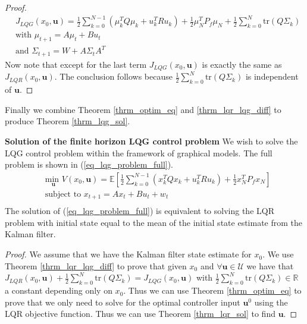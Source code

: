 \begin{proof}
\begin{equation}
\begin{aligned}
&J_{LQG}(x_0, \mathbf{u}) = \frac{1}{2}\sum_{k=0}^{N-1} \left( \mu_k^TQ\mu_k + u_k^TRu_k \right) + \frac{1}{2}\mu_N^TP_f\mu_N + \frac{1}{2}\sum_{k=0}^N \text{tr}(Q\Sigma_k) \\
&\text{with } \mu_{t+1} = A\mu_t +Bu_t \\
&\text{and } \Sigma_{t+1} = W+A\Sigma_t A^T 
\end{aligned}
\label{eq_simpl_obj_func}
\end{equation}
Now note that except for the last term $J_{LQG}(x_0, \mathbf{u})$ is exactly the same as $J_{LQR}(x_0, \mathbf{u})$. The conclusion follows because $\frac{1}{2}\sum_{k=0}^N \text{tr}(Q\Sigma_k)$ is independent of $\mathbf{u}$. 
\end{proof}
Finally we combine Theorem \ref{thrm_optim_eq} and \ref{thrm_lqr_lqg_diff} to produce Theorem \ref{thrm_lqg_sol}.
\begin{thrm}
\textbf{Solution of the finite horizon LQG control problem} We wish to solve the LQG control problem within the framework of graphical models. The full problem is shown in (\ref{eq_lqg_problem_full}).
\begin{equation}
\begin{aligned}
&\underset{\mathbf{u}}{\text{min }} V(x_0, \mathbf{u}) = \mathbb{E}\left[ \frac{1}{2}\sum_{k=0}^{N-1} \left( x_k^TQx_k + u_k^TRu_k \right) + \frac{1}{2}x_N^TP_fx_N \right] \\
& \text{subject to } x_{t+1}=Ax_t+Bu_t + w_t\\
\end{aligned}
\label{eq_lqg_problem_full}
\end{equation}
The solution of (\ref{eq_lqg_problem_full}) is equivalent to solving the LQR problem with initial state equal to the mean of the initial state estimate from the Kalman filter.
\label{thrm_lqg_sol}
\end{thrm}
\begin{proof}
We assume that we have the Kalman filter state estimate for $x_0$. We use Theorem \ref{thrm_lqr_lqg_diff} to prove that given $x_0$ and $\forall \mathbf{u} \in \mathcal{U}$ we have that $J_{LQR}(x_0, \mathbf{u}) + \frac{1}{2}\sum_{k=0}^N \text{tr}(Q\Sigma_k) = J_{LQG}(x_0, \mathbf{u})$ with $\frac{1}{2}\sum_{k=0}^N \text{tr}(Q\Sigma_k) \in \mathbb{R}$ a constant depending only on $x_0$. Thus we can use Theorem \ref{thrm_optim_eq} to prove that we only need to solve for the optimal controller input $\mathbf{u}^0$ using the LQR objective function. Thus we can use Theorem \ref{thrm_lqr_sol} to find $\mathbf{u}$. 
\end{proof}

